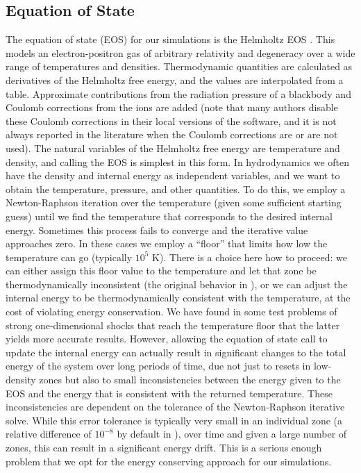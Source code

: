 \documentclass[12pt]{article}
\begin{document}
\subsection{Equation of State}
\label{sec:eos}

The equation of state (EOS) for our simulations is the Helmholtz EOS
\citep{timmes-swesty:2000}. This models an electron-positron gas of
arbitrary relativity and degeneracy over a wide range of temperatures
and densities. Thermodynamic quantities are calculated as derivatives
of the Helmholtz free energy, and the values are interpolated from a
table. Approximate contributions from the radiation pressure
of a blackbody and Coulomb corrections from the ions are added (note that
many authors disable these Coulomb corrections in their local versions
of the software, and it is not always reported in the literature when
the Coulomb corrections are or are not used).
The natural variables of the Helmholtz free energy are
temperature and density, and calling the EOS is simplest in this
form. In hydrodynamics we often have the density and
internal energy as independent variables, and we want to obtain the
temperature, pressure, and other quantities. To do this, we employ a
Newton-Raphson iteration over the temperature (given some sufficient
starting guess) until we find the temperature that corresponds to the
desired internal energy. Sometimes this process fails to converge and
the iterative value approaches zero. In these cases we employ a
``floor'' that limits how low the temperature can go (typically 
$10^5$ K). There is a choice here how to proceed: we can either
assign this floor value to the temperature and let that zone be
thermodynamically inconsistent (the original behavior in \castro), or
we can adjust the internal energy to be thermodynamically consistent
with the temperature, at the cost of violating energy conservation. We
have found in some test problems of strong one-dimensional shocks that reach 
the temperature floor that the latter yields more accurate results. 
However, allowing the equation of state call to update the 
internal energy can actually result in significant changes to the 
total energy of the system over long periods of time, 
due not just to resets in low-density zones but also to small 
inconsistencies between the energy given to the EOS and the energy 
that is consistent with the returned temperature. These inconsistencies
are dependent on the tolerance of the Newton-Raphson iterative solve.
While this error tolerance is typically very small in an individual zone (a relative 
difference of $10^{-8}$ by default in \castro), over time and given 
a large number of zones, this can result in a significant energy 
drift. This is a serious enough problem that we opt for the energy 
conserving approach for our simulations.
\end{document}
